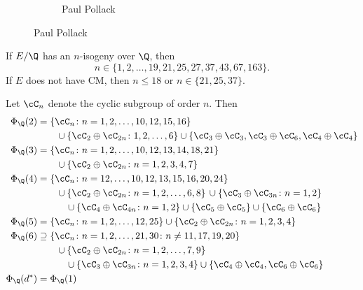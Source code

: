 \begin{frame}[plain]
\begin{figure}[h]
\begin{subfigure}{0.3\textwidth}
	\caption{Paul Pollack}
	\end{subfigure}
	\end{figure}
\end{frame}



\begin{frame}
\end{frame}



\begin{frame}[plain]
	\begin{thm}
	If $E/\Q$ has an $n$-isogeny over $\Q$, then 
		\[
		n \in \{1,2,\ldots,19,21,25,27,37,43,67,163\}. 
		\]
	If $E$ does not have CM, then $n \leq 18$ or $n \in \{21,25,37\}$. 
	\end{thm}
\end{frame}



\begin{frame}[plain]
\begin{thm}
Let $\cC_n$ denote the cyclic subgroup of order $n$. Then 
	\[
	\begin{aligned}
	\Phi_\Q(2)&= \{ \cC_n \colon n= 1,2,\ldots,10,12,15,16\} \\
			&\quad\quad\cup \{ \cC_2 \oplus \cC_{2n} \colon 1,2,\ldots,6\} \cup \{ \cC_3 \oplus \cC_3, \cC_3 \oplus \cC_6, \cC_4 \oplus \cC_4 \} \\
	\Phi_\Q(3)&= \{ \cC_n \colon n=1,2,\ldots,10,12,13,14,18,21 \} \\
			&\quad\quad\cup \{ \cC_2 \oplus \cC_{2n} \colon n=1,2,3,4,7 \} \\
	\Phi_\Q(4)&= \{ \cC_n \colon n=12,\ldots,10,12,13,15,16,20,24 \} \\
			&\quad\quad\cup \{ \cC_2 \oplus \cC_{2n} \colon n=1,2,\ldots,6,8\} \, \cup \{ \cC_3 \oplus \cC_{3n} \colon n=1,2 \} \\
			&\quad\quad\quad\cup \{ \cC_4 \oplus \cC_{4n} \colon n=1,2 \} \cup \{ \cC_5 \oplus \cC_5 \} \cup \{ \cC_6 \oplus \cC_6 \}	\\
	\Phi_\Q(5)&= \{ \cC_n \colon n=1,2,\ldots,12,25\} \cup \{ \cC_2 \oplus \cC_{2n} \colon n=1,2,3,4\} \\
	\Phi_\Q(6)&\supseteq \{ \cC_n \colon n=1,2,\ldots,21,30 \colon n \neq 11,17,19,20\} \\
			&\quad\quad\cup \{ \cC_2 \oplus \cC_{2n} \colon n=1,2,\ldots,7,9 \} \\
			&\quad\quad\quad\cup \{ \cC_3 \oplus \cC_{3n} \colon n=1,2,3,4\} \cup \{ \cC_4 \oplus \cC_4, \cC_6 \oplus \cC_6 \} \\
	\Phi_\Q(d^*)&= \Phi_\Q(1)
	\end{aligned}
	\]
\end{thm}
\end{frame}



